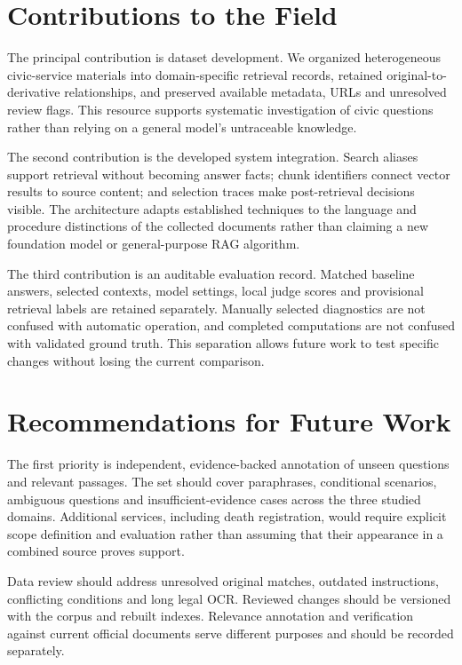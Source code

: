 \section{Contributions to the Field}
The principal contribution is dataset development. We organized heterogeneous civic-service materials into domain-specific retrieval records, retained original-to-derivative relationships, and preserved available metadata, URLs and unresolved review flags. This resource supports systematic investigation of civic questions rather than relying on a general model's untraceable knowledge.

The second contribution is the developed system integration. Search aliases support retrieval without becoming answer facts; chunk identifiers connect vector results to source content; and selection traces make post-retrieval decisions visible. The architecture adapts established techniques to the language and procedure distinctions of the collected documents rather than claiming a new foundation model or general-purpose RAG algorithm.

The third contribution is an auditable evaluation record. Matched baseline answers, selected contexts, model settings, local judge scores and provisional retrieval labels are retained separately. Manually selected diagnostics are not confused with automatic operation, and completed computations are not confused with validated ground truth. This separation allows future work to test specific changes without losing the current comparison.

\section{Recommendations for Future Work}
The first priority is independent, evidence-backed annotation of unseen questions and relevant passages. The set should cover paraphrases, conditional scenarios, ambiguous questions and insufficient-evidence cases across the three studied domains. Additional services, including death registration, would require explicit scope definition and evaluation rather than assuming that their appearance in a combined source proves support.

Data review should address unresolved original matches, outdated instructions, conflicting conditions and long legal OCR. Reviewed changes should be versioned with the corpus and rebuilt indexes. Relevance annotation and verification against current official documents serve different purposes and should be recorded separately.

